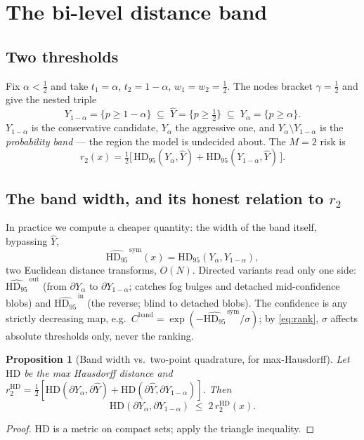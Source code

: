\documentclass[11pt]{article}
\newtheorem{proposition}{Proposition}
\theoremstyle{remark}
\newcommand{\Yhat}{\widehat{Y}}
\newcommand{\Ylo}{Y_{\alpha}}
\newcommand{\Yhi}{Y_{1-\alpha}}
\newcommand{\HD}{\mathrm{HD}}
\newcommand{\HDF}{\mathrm{HD}_{95}}
\newcommand{\bd}{\partial}
\begin{document}
\section{The bi-level distance band}\label{sec:band}

\subsection{Two thresholds}

Fix $\alpha<\tfrac12$ and take $t_1=\alpha$, $t_2=1-\alpha$, $w_1=w_2=\tfrac12$.
The nodes bracket $\gamma=\tfrac12$ and give the nested triple
\begin{equation}\label{eq:nesting}
\Yhi = \{p \ge 1-\alpha\} \;\subseteq\; \Yhat = \{p\ge\tfrac12\} \;\subseteq\;
\Ylo = \{p\ge\alpha\} .
\end{equation}
$\Yhi$ is the conservative candidate, $\Ylo$ the aggressive one, and
$\Ylo\setminus\Yhi$ is the \emph{probability band} --- the region the model is
undecided about. The $M=2$ risk is
\begin{equation}\label{eq:r2}
r_2(x) = \tfrac12\Big[\, \HDF(\Ylo,\Yhat) + \HDF(\Yhi,\Yhat) \,\Big].
\end{equation}

\subsection{The band width, and its honest relation to $r_2$}

In practice we compute a cheaper quantity: the width of the band itself, bypassing
$\Yhat$,
\begin{equation}\label{eq:bandsym}
\widehat{\HDF}^{\,\mathrm{sym}}(x) = \HDF(\Ylo,\Yhi),
\end{equation}
two Euclidean distance transforms, $O(N)$. Directed variants read only one side:
$\widehat{\HDF}^{\,\mathrm{out}}$ (from $\bd\Ylo$ to $\bd\Yhi$; catches fog bulges
and detached mid-confidence blobs) and $\widehat{\HDF}^{\,\mathrm{in}}$ (the
reverse; blind to detached blobs). The confidence is any strictly decreasing map,
e.g.\ $C^{\mathrm{band}} = \exp(-\widehat{\HDF}^{\,\mathrm{sym}}/\sigma)$; by
\eqref{eq:rank}, $\sigma$ affects absolute thresholds only, never the ranking.

\begin{proposition}[Band width vs.\ two-point quadrature, for max-Hausdorff]\label{prop:band}
Let $\HD$ be the \emph{max} Hausdorff distance and
$r_2^{\HD} = \tfrac12[\HD(\bd\Ylo,\bd\Yhat)+\HD(\bd\Yhat,\bd\Yhi)]$. Then
\begin{equation}
\HD(\bd\Ylo,\bd\Yhi) \;\le\; 2\, r_2^{\HD}(x).
\end{equation}
\end{proposition}
\begin{proof}
$\HD$ is a metric on compact sets; apply the triangle inequality.
\end{proof}
\end{document}
